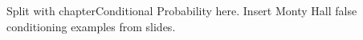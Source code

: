 \begin{problems}
\classproblems
{}

\homeworkproblems
{}

\end{problems}


\begin{editingnotes}
Split with chapter{Conditional Probability}\label{chap:cond_prob}
here.  Insert Monty Hall false conditioning examples from slides.
\end{editingnotes}

\endinput
